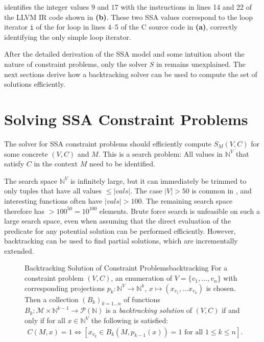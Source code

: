     identifies the integer values $9$ and $17$ with the
    instructions in lines 14 and 22 of the LLVM IR code shown in
     {\bf(b)}.
    These two SSA values correspond to the loop iterator \texttt{i} of the for
    loop in lines 4--5 of the C source code in  {\bf(a)},
    correctly identifying the only simple loop iterator.

    After the detailed derivation of the SSA model and some intuition about the
    nature of constraint problems, only the solver $S$ in
     remains unexplained.
    The next sections derive how a backtracking solver can be used to
    compute the set of solutions efficiently.

\section{Solving SSA Constraint Problems}
\label{sec:constraintsolving}

    The solver for SSA constraint problems should efficiently compute $S_M(V,C)$
    for some concrete $(V,C)$ and $M$.
    This is a search problem:
    All values in $\mathbb N^V$ that satisfy $C$ in the context $M$ need to be
    identified.

    The search space $\mathbb N^V$ is infinitely large, but it can immediately
    be trimmed to only tuples that have all values $\leq|vals|$.
    The case \mbox{$|V|>50$} is common in
    , and interesting
    functions often have \mbox{$|vals|>100$}.
    The remaining search space therefore has $>100^{50}=10^{100}$ elements.
    Brute force search is unfeasible on such a large search space, even when assuming
    that the direct evaluation of the predicate for any potential solution can
    be performed efficiently.
    However, backtracking can be used to find partial solutions, which are
    incrementally extended.

\begin{figure}[h]
    \begin{definition}{Backtracking Solution of Constraint Problems}{backtracking}
        For a constraint problem $(V,C)$, an enumeration of
        $V=\{v_1,\dots,v_n\}$ with corresponding projections
        $p_k\colon\mathbb N^V\rightarrow\mathbb N^k$,
        $x\mapsto(x_{v_1},\dots x_{v_k})$ is chosen.
        Then a collection $(B_k)_{k=1\dots n}$ of functions
        $B_k:\mathcal M\times \mathbb N^{k-1}\rightarrow\mathcal P(\mathbb N)$
        is a {\em backtracking solution} of $(V,C)$ if and only if for all
        $x\in\mathbb N^V$ the following is satisfied:
        \begin{align}
            C(M,x)=1\iff\left[x_{v_k}\in B_k(M,p_{k-1}(x))=1\text{ for all }1\leq k\leq n\right].
        \end{align}
    \end{definition}
\end{figure}

